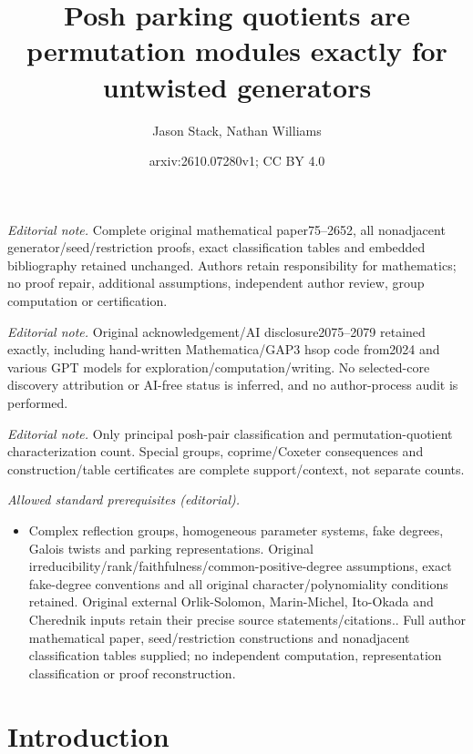 \documentclass[10pt,a4paper]{amsart}
\title{Posh parking quotients are permutation modules exactly for untwisted generators}
\author{Jason Stack, Nathan Williams}
\date{arxiv:2610.07280v1; CC BY 4.0}
\theoremstyle{definition}
\begin{document}
\maketitle
\noindent\textit{Editorial note.} Complete original mathematical paper75--2652, all nonadjacent generator/seed/restriction proofs, exact classification tables and embedded bibliography retained unchanged. Authors retain responsibility for mathematics; no proof repair, additional assumptions, independent author review, group computation or certification.\par\medskip
\noindent\textit{Editorial note.} Original acknowledgement/AI disclosure2075--2079 retained exactly, including hand-written Mathematica/GAP3 hsop code from2024 and various GPT models for exploration/computation/writing. No selected-core discovery attribution or AI-free status is inferred, and no author-process audit is performed.\par\medskip
\noindent\textit{Editorial note.} Only principal posh-pair classification and permutation-quotient characterization count. Special groups, coprime/Coxeter consequences and construction/table certificates are complete support/context, not separate counts.\par\medskip
\noindent\textit{Allowed standard prerequisites (editorial).}\begin{itemize}
\item Complex reflection groups, homogeneous parameter systems, fake degrees, Galois twists and parking representations. Original irreducibility/rank/faithfulness/common-positive-degree assumptions, exact fake-degree conventions and all original character/polynomiality conditions retained. Original external Orlik-Solomon, Marin-Michel, Ito-Okada and Cherednik inputs retain their precise source statements/citations.. Full author mathematical paper, seed/restriction constructions and nonadjacent classification tables supplied; no independent computation, representation classification or proof reconstruction.
\end{itemize}\medskip
\section{Introduction}
\end{document}
